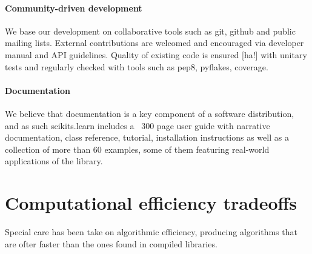 \documentclass[twoside,11pt]{article}
\begin{document}


\paragraph{Community-driven development}

We base our development on collaborative tools such as git, github and
public mailing lists. External contributions are welcomed and
encouraged via developer manual and API guidelines. Quality of
existing code is ensured [ha!] with unitary tests and regularly
checked with tools such as pep8, pyflakes, coverage.




\paragraph{Documentation}

We believe that documentation is a key component of a software
distribution, and as such scikits.learn includes a ~300 page user
guide with narrative documentation, class reference, tutorial,
installation instructions as well as a collection of more than 60
examples, some of them featuring real-world applications of the
library.


\section{Computational efficiency tradeoffs}


Special care has been take on algorithmic efficiency, producing
algorithms that are ofter faster than the ones found in compiled
libraries.
\end{document}
